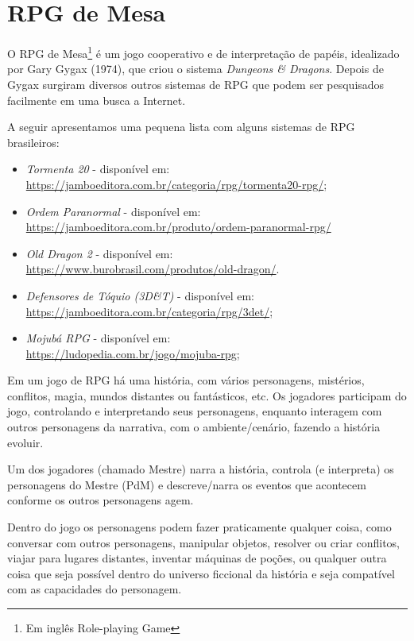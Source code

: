 \chapter{\label{ch:rpg}RPG de Mesa}

O RPG de Mesa\footnote{Em inglês Role-playing Game} é um jogo cooperativo e de interpretação de papéis, idealizado por Gary Gygax (1974), que criou o sistema \emph{Dungeons \& Dragons}. Depois de Gygax surgiram diversos outros sistemas de RPG que podem ser pesquisados facilmente em uma busca a Internet. 

A seguir apresentamos uma pequena lista com alguns sistemas de RPG brasileiros:
\begin{itemize}
	\item \emph{Tormenta 20} - disponível em: \\ \url{https://jamboeditora.com.br/categoria/rpg/tormenta20-rpg/};
	\item \emph{Ordem Paranormal} - disponível em: \\
	\url{https://jamboeditora.com.br/produto/ordem-paranormal-rpg/}
	\item \emph{Old Dragon 2} - disponível em: \\ \url{https://www.burobrasil.com/produtos/old-dragon/}.
	\item \emph{Defensores de Tóquio (3D\&T)} - disponível em: \\ \url{https://jamboeditora.com.br/categoria/rpg/3det/};
	\item \emph{Mojubá RPG} - disponível em: \\ \url{https://ludopedia.com.br/jogo/mojuba-rpg};
\end{itemize}

Em um jogo de RPG há uma história, com vários personagens, mistérios, conflitos, magia, mundos distantes ou fantásticos, etc. Os jogadores participam do jogo, controlando e interpretando seus personagens, enquanto interagem com outros personagens da narrativa, com o ambiente/cenário, fazendo a história evoluir. 

Um dos jogadores (chamado Mestre) narra a história, controla (e interpreta) os personagens do Mestre (PdM) e descreve/narra os eventos que acontecem conforme os outros personagens agem. 

Dentro do jogo os personagens podem fazer praticamente qualquer coisa, como conversar com outros personagens, manipular objetos, resolver ou criar conflitos, viajar para lugares distantes, inventar máquinas de poções, ou qualquer outra coisa que seja possível dentro do universo ficcional da história e seja compatível com as capacidades do personagem.

